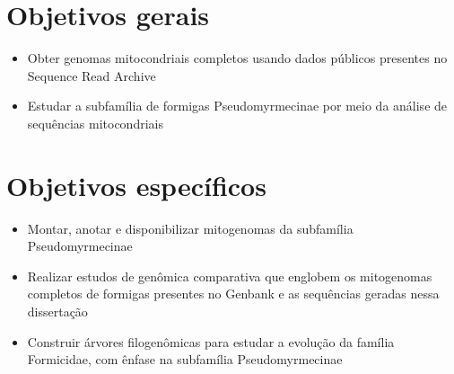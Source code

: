 \documentclass[../DISSERTACAO_MAIN.tex]{subfiles}
\begin{document}
\section{Objetivos gerais}

\begin{itemize}
	\item Obter genomas mitocondriais completos usando dados públicos presentes no Sequence Read Archive
	\item Estudar a subfamília de formigas Pseudomyrmecinae por meio da análise de sequências mitocondriais
\end{itemize}

\section{Objetivos específicos}

\begin{itemize}
	\item Montar, anotar e disponibilizar mitogenomas da subfamília Pseudomyrmecinae
	\item Realizar estudos de genômica comparativa que englobem os mitogenomas completos de formigas presentes no Genbank e as sequências geradas nessa dissertação
	\item Construir árvores filogenômicas para estudar a evolução da família Formicidae, com ênfase na subfamília Pseudomyrmecinae
\end{itemize}
\end{document}

